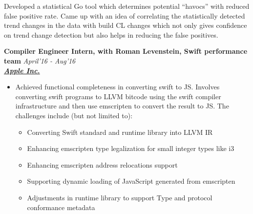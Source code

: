 \documentclass[9pt]{article}
\newenvironment{changemargin}[2]{%
  \begin{list}{}{%
    \setlength{\topsep}{0pt}%
    \setlength{\leftmargin}{#1}%
    \setlength{\rightmargin}{#2}%
    \setlength{\listparindent}{\parindent}%
    \setlength{\itemindent}{\parindent}%
    \setlength{\parsep}{\parskip}%
  }%
  \item[]}{\end{list}
}
\newcommand{\cmnt}[1]{}
\newenvironment{body} {
	\vspace*{-16pt}
	\begin{changemargin}{-0.25in}{-0.5in}
  }	
	{\end{changemargin}
}
\begin{document}
\begin{body}
\begin{itemize}
                        \cmnt{Challenges are:
			\begin{itemize}
				\item To determine ``havocs'' amid noisy data.
				\item To reduce false positives and pinpoint actionable ``havocs'' to the service providers.
			\end{itemize}
                        }
			Developed a statistical Go tool which determines
			potential ``havocs'' with reduced false positive rate.
			Came up with an idea of correlating the
			statistically detected trend changes in the data with
			build CL changes which not only gives confidence on
			trend change detection but also helps in reducing the
			false positives.

	\end{itemize}


 \medskip
        \textbf{Compiler Engineer Intern, with Roman Levenstein, Swift performance team} \hfill \emph{April'16 - Aug'16}\\
	\textbf{\emph{\href{http://www.apple.com}{Apple Inc.}}}
	\begin{itemize} \itemsep -0pt

                \item  Achieved functional completeness in converting swift to JS. Involves 
                 converting swift programs to LLVM bitcode using the
                swift compiler infrastructure and then use emscripten to convert the result to
                JS. The challenges include (but not limited to):
                  \begin{itemize}
                    \item Converting Swift standard and runtime library into LLVM IR
                    \item Enhancing emscripten type legalization for small integer types like i3
                    \item Enhancing emscripten address relocations support
                    \item Supporting dynamic loading of JavaScript generated from emscripten
                    \item Adjustments in runtime library  to support Type and protocol conformance metadata
                  \end{itemize}


\end{itemize}
\end{body}
\end{document}
